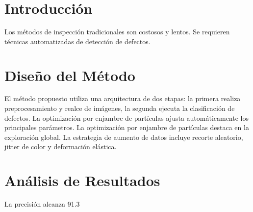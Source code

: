 \documentclass{article}
\begin{document}
\section{Introducción}
Los métodos de inspección tradicionales son costosos y lentos. Se requieren técnicas automatizadas de detección de defectos.
\section{Diseño del Método}
El método propuesto utiliza una arquitectura de dos etapas: la primera realiza preprocesamiento y realce de imágenes, la segunda ejecuta la clasificación de defectos.
La optimización por enjambre de partículas ajusta automáticamente los principales parámetros. La optimización por enjambre de partículas destaca en la exploración global.
La estrategia de aumento de datos incluye recorte aleatorio, jitter de color y deformación elástica.
\section{Análisis de Resultados}
La precisión alcanza 91.3%
\end{document}
